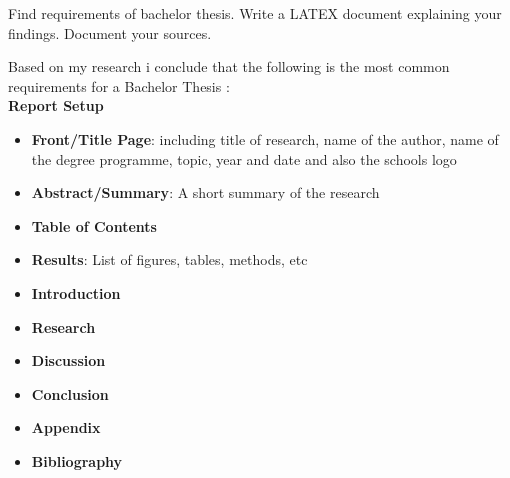 \begin{displayquote}
Find requirements of bachelor thesis. Write a LATEX document explaining your
findings. Document your sources.
\end{displayquote}

Based on my research i conclude that the following is the most common requirements for a Bachelor Thesis 
    \cite{guidelines-for-writing-your-thesis-report}
    \cite{get-thesis-how-to-write-a-winning-bachelor-thesis}
    \cite{oxford-thesis}:\\

\textbf{Report Setup}
\begin{itemize}
    \item \textbf{Front/Title Page}: including title of research, name of the author, name of the degree programme, topic, year and date and also the schools logo
    \item \textbf{Abstract/Summary}: A short summary of the research
    \item \textbf{Table of Contents}
    \item \textbf{Results}: List of figures, tables, methods, etc
    \item \textbf{Introduction}
    \item \textbf{Research}
    \item \textbf{Discussion}
    \item \textbf{Conclusion}
    \item \textbf{Appendix}
    \item \textbf{Bibliography}
\end{itemize}